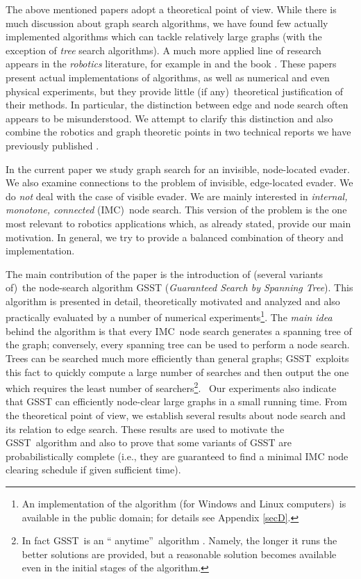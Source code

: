 \documentclass[11pt]{article}\usepackage{amsmath}
\begin{document}
The above mentioned papers adopt a theoretical point of view. While there is
much discussion about graph search algorithms, we have found few actually
implemented algorithms which can tackle relatively large graphs (with the
exception of \emph{tree} search algorithms). A much more applied line of
research appears in the \emph{robotics} literature, for example in
\cite{Gerkey1,Gerkey2,Guibas,Lavalle} and the book \cite{LavalleBook}. These
papers present actual implementations of algorithms, as well as numerical and
even physical experiments, but they provide little (if any)\ theoretical
justification of their methods. In particular, the distinction between edge
and node search often appears to be misunderstood. We attempt to clarify this
distinction and also combine the robotics and graph theoretic points in two
technical reports we have previously published \cite{Hollinger1,Kehagias1}.

In the current paper we study graph search for an invisible, node-located
evader. We also examine connections to the problem of invisible, edge-located
evader. We do \emph{not} deal with the case of visible evader. We are mainly
interested in \emph{internal, monotone, connected }(IMC)\ node search. This
version of the problem is the one most relevant to robotics applications
which, as already stated, provide our main motivation. In general, we try to
provide a balanced combination of theory and implementation.

The main contribution of the paper is the introduction of (several variants
of)\ the node-search algorithm GSST (\emph{Guaranteed Search by Spanning
Tree}). This algorithm is presented in detail, theoretically motivated and
analyzed and also practically evaluated by a number of numerical
experiments\footnote{An implementation of the algorithm (for Windows and Linux
computers)\ is available in the public domain; for details see Appendix
\ref{secD}.}. The \emph{main idea }behind the algorithm is that every
IMC\ node search generates a spanning tree of the graph; conversely, every
spanning tree can be used to perform a node search. Trees can be searched much
more efficiently than general graphs; GSST\ exploits this fact to quickly
compute a large number of searches and then output the one which requires the
least number of searchers\footnote{In fact GSST\ is an \textquotedblleft
anytime\textquotedblright\ algorithm \cite{Zilberstein}. Namely, the longer it
runs the better solutions are provided, but a reasonable solution becomes
available even in the initial stages of the algorithm.}. \ Our experiments
also indicate that GSST can efficiently node-clear large graphs in a small
running time. From the theoretical point of view, we establish several results
about node search and its relation to edge search. These results are used to
motivate the GSST\ algorithm and also to prove that some variants of GSST are
probabilistically complete (i.e., they are guaranteed to find a minimal IMC
node clearing schedule if given sufficient time).
\end{document}
